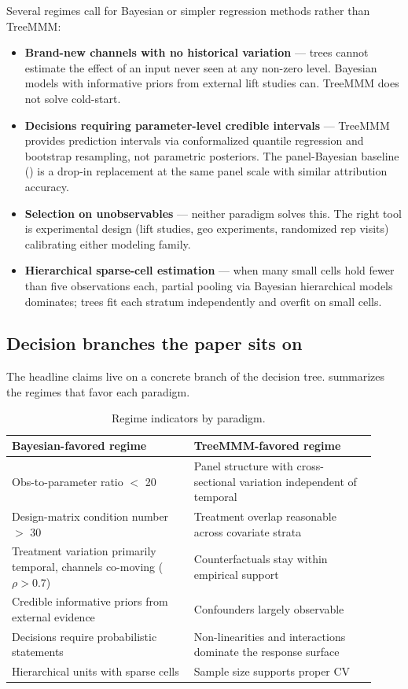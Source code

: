 \documentclass[review,12pt]{elsarticle}
\begin{document}
Several regimes call for Bayesian or simpler regression methods rather than
TreeMMM:

\begin{itemize}
\item \textbf{Brand-new channels with no historical variation} --- trees cannot
  estimate the effect of an input never seen at any non-zero level. Bayesian
  models with informative priors from external lift studies can. TreeMMM does
  not solve cold-start.
\item \textbf{Decisions requiring parameter-level credible intervals} ---
  TreeMMM provides prediction intervals via conformalized quantile regression
  and bootstrap resampling, not parametric posteriors. The panel-Bayesian
  baseline () is a drop-in replacement at the same
  panel scale with similar attribution accuracy.
\item \textbf{Selection on unobservables} --- neither paradigm solves this.
  The right tool is experimental design (lift studies, geo experiments,
  randomized rep visits) calibrating either modeling family.
\item \textbf{Hierarchical sparse-cell estimation} --- when many small cells
  hold fewer than five observations each, partial pooling via Bayesian
  hierarchical models dominates; trees fit each stratum independently and
  overfit on small cells.
\end{itemize}

\subsection{Decision branches the paper sits on}
\label{sec:intro:decision}

The headline claims live on a concrete branch of the decision tree.
 summarizes the regimes that favor each paradigm.

\begin{table}[ht]
\centering
\small
\caption{Regime indicators by paradigm.}
\label{tab:regimes}
\begin{tabular}{@{}p{0.46\linewidth}p{0.46\linewidth}@{}}
\toprule
Bayesian-favored regime & TreeMMM-favored regime \\
\midrule
Obs-to-parameter ratio $<$ 20 & Panel structure with cross-sectional variation independent of temporal \\
Design-matrix condition number $>$ 30 & Treatment overlap reasonable across covariate strata \\
Treatment variation primarily temporal, channels co-moving ($\rho > 0.7$) & Counterfactuals stay within empirical support \\
Credible informative priors from external evidence & Confounders largely observable \\
Decisions require probabilistic statements & Non-linearities and interactions dominate the response surface \\
Hierarchical units with sparse cells & Sample size supports proper CV \\
\bottomrule
\end{tabular}
\end{table}
\end{document}
